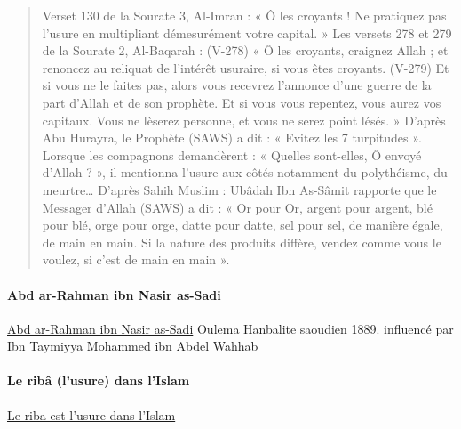 \begin{quote}
Verset 130 de la Sourate 3, Al-Imran : « Ô les croyants ! Ne pratiquez pas l’usure en multipliant démesurément votre capital. »
Les versets 278 et 279 de la Sourate 2, Al-Baqarah : (V-278) « Ô les croyants, craignez Allah ; et renoncez au reliquat de l’intérêt usuraire, si vous êtes croyants. (V-279) Et si vous ne le faites pas, alors vous recevrez l’annonce d’une guerre de la part d’Allah et de son prophète. Et si vous vous repentez, vous aurez vos capitaux. Vous ne lèserez personne, et vous ne serez point lésés. »
D’après Abu Hurayra, le Prophète (SAWS) a dit : « Evitez les 7 turpitudes ». Lorsque les compagnons demandèrent : « Quelles sont-elles, Ô envoyé d’Allah ? », il mentionna l’usure aux côtés notamment du polythéisme, du meurtre…
D’après Sahih Muslim : Ubâdah Ibn As-Sâmit rapporte que le Messager d’Allah (SAWS) a dit : « Or pour Or, argent pour argent, blé pour blé, orge pour orge, datte pour datte, sel pour sel, de manière égale, de main en main. Si la nature des produits diffère, vendez comme vous le voulez, si c’est de main en main ». 
\end{quote}

 
 \paragraph{Abd ar-Rahman ibn Nasir as-Sadi}\href{https://fr.wikipedia.org/wiki/Abd_ar-Rahman_ibn_Nasir_as-Sadi}{Abd ar-Rahman ibn Nasir as-Sadi} Oulema Hanbalite saoudien 1889. influencé par 	
Ibn Taymiyya
Mohammed ibn Abdel Wahhab
 
 \paragraph{ Le ribâ (l’usure) dans l’Islam}
 
 \href{https://www.ajib.fr/le-riba-lusure-dans-lislam/}{Le riba est l'usure dans l'Islam}
 
